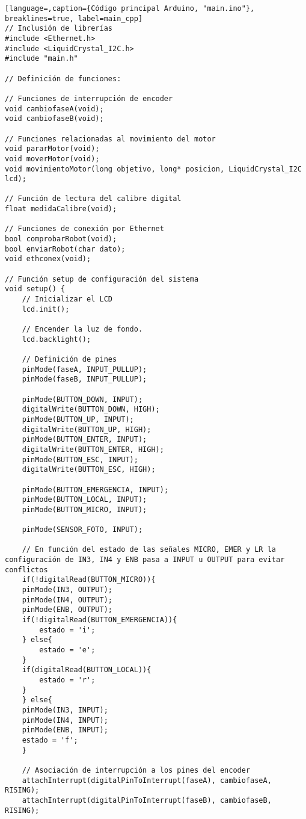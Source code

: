 
\begin{lstlisting}[language=,caption={Código principal Arduino, "main.ino"}, breaklines=true, label=main_cpp]
// Inclusión de librerías
#include <Ethernet.h>
#include <LiquidCrystal_I2C.h>
#include "main.h"

// Definición de funciones:

// Funciones de interrupción de encoder
void cambiofaseA(void);
void cambiofaseB(void);

// Funciones relacionadas al movimiento del motor
void pararMotor(void);
void moverMotor(void);
void movimientoMotor(long objetivo, long* posicion, LiquidCrystal_I2C lcd);

// Función de lectura del calibre digital
float medidaCalibre(void);

// Funciones de conexión por Ethernet
bool comprobarRobot(void);
bool enviarRobot(char dato);
void ethconex(void);

// Función setup de configuración del sistema
void setup() {
    // Inicializar el LCD
    lcd.init();
    
    // Encender la luz de fondo.
    lcd.backlight();
    
    // Definición de pines
    pinMode(faseA, INPUT_PULLUP);
    pinMode(faseB, INPUT_PULLUP);

    pinMode(BUTTON_DOWN, INPUT);
    digitalWrite(BUTTON_DOWN, HIGH);
    pinMode(BUTTON_UP, INPUT);
    digitalWrite(BUTTON_UP, HIGH);
    pinMode(BUTTON_ENTER, INPUT);
    digitalWrite(BUTTON_ENTER, HIGH);
    pinMode(BUTTON_ESC, INPUT);
    digitalWrite(BUTTON_ESC, HIGH);

    pinMode(BUTTON_EMERGENCIA, INPUT);
    pinMode(BUTTON_LOCAL, INPUT);
    pinMode(BUTTON_MICRO, INPUT);

    pinMode(SENSOR_FOTO, INPUT);

    // En función del estado de las señales MICRO, EMER y LR la configuración de IN3, IN4 y ENB pasa a INPUT u OUTPUT para evitar conflictos
    if(!digitalRead(BUTTON_MICRO)){
    pinMode(IN3, OUTPUT);
    pinMode(IN4, OUTPUT);
    pinMode(ENB, OUTPUT);
    if(!digitalRead(BUTTON_EMERGENCIA)){
        estado = 'i';
    } else{
        estado = 'e';
    }
    if(digitalRead(BUTTON_LOCAL)){
        estado = 'r';
    }
    } else{
    pinMode(IN3, INPUT);
    pinMode(IN4, INPUT);
    pinMode(ENB, INPUT);
    estado = 'f';
    }

    // Asociación de interrupción a los pines del encoder
    attachInterrupt(digitalPinToInterrupt(faseA), cambiofaseA, RISING);
    attachInterrupt(digitalPinToInterrupt(faseB), cambiofaseB, RISING);
    

\end{lstlisting}
